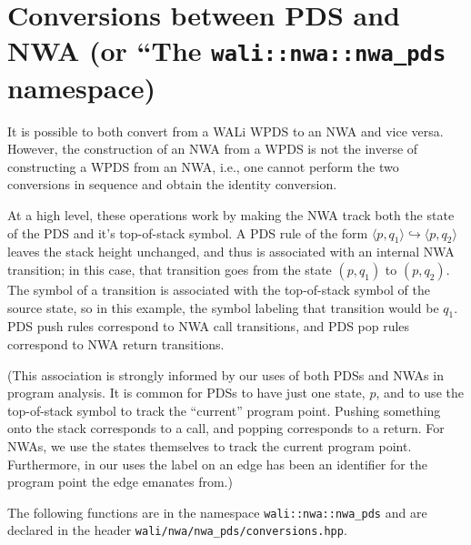\section{Conversions between PDS and NWA (or ``The
  \texttt{wali::nwa::nwa\_pds} namespace)}
\label{Se:Conversions}


It is possible to both convert from a WALi WPDS to an NWA and vice versa.
However, the construction of an NWA from a WPDS is not the inverse
of constructing a WPDS from an NWA, i.e., one cannot perform the two
conversions in sequence and obtain the identity conversion.

At a high level, these operations work by making the NWA track both the state
of the PDS and it's top-of-stack symbol. A PDS rule of the form $\langle
p,q_1 \rangle \hookrightarrow \langle p,q_2 \rangle$ leaves the stack height
unchanged, and thus is associated with an internal NWA transition; in this
case, that transition goes from the state $(p,q_1)$ to $(p,q_2)$. The symbol
of a transition is associated with the top-of-stack symbol of the source
state, so in this example, the symbol labeling that transition would be
$q_1$. PDS push rules correspond to NWA call transitions, and PDS pop rules
correspond to NWA return transitions.

(This association is strongly informed by our uses of both PDSs and NWAs in
program analysis. It is common for PDSs to have just one state, $p$, and to
use the top-of-stack symbol to track the ``current'' program point. Pushing
something onto the stack corresponds to a call, and popping corresponds to a
return. For NWAs, we use the states themselves to track the current program
point. Furthermore, in our uses the label on an edge has been an identifier
for the program point the edge emanates from.)


The following functions are in the namespace \texttt{wali::nwa::nwa\_pds} and
are declared in the header \texttt{wali/nwa/nwa\_pds/conversions.hpp}.


